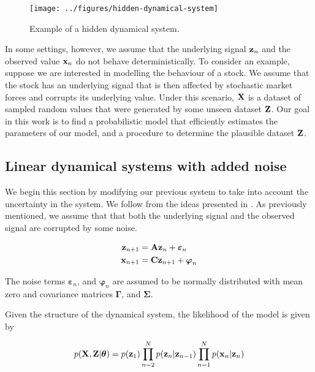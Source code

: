 \documentclass[11pt]{article}
\numberwithin{equation}{section}
\newcommand{\x}{{\bf x}}
\newcommand{\z}{{\bf z}}
\begin{document}
\begin{figure}[h!]
	\centering
	\texttt{[image: ../figures/hidden-dynamical-system]}
	\caption{Example of a hidden dynamical system.}
	\label{fig:hidden-dynamical-system}
\end{figure}

In some settings, however, we assume that the underlying signal $\z_n$ and the observed value $\x_n$ do not behave deterministically. To consider an example, suppose we are interested in modelling the behaviour of a stock. We assume that the stock has an underlying signal that is then affected by stochastic market forces and corrupts its underlying value. Under this scenario, ${\bf X}$ is a dataset of sampled random values that were generated by some unseen dataset ${\bf Z}$. Our goal in this work is to find a probabilistic model that efficiently estimates the parameters of our model, and a procedure to determine the plausible dataset $\bf Z$. 


\subsection{Linear dynamical systems with added noise}
We begin this section by modifying our previous system to take into account the uncertainty in the system. We follow from the ideas presented in \cite{prml}. As previously mentioned, we assume that that both the underlying signal and the observed signal are corrupted by some noise.
 

\begin{align*}
	\z_{n+1} &= {\bf A} \z_{n} + \boldsymbol\varepsilon_n\\
	\x_{n+1} &= {\bf C} \z_{n+1} + \boldsymbol\varphi_n
\end{align*}

The noise terms $\boldsymbol{\varepsilon}_n$, and $\boldsymbol{\varphi}_n$ are assumed to be normally distributed with mean zero and covariance matrices $\boldsymbol{\Gamma}$, and $\boldsymbol{\Sigma}$.

Given the structure of the dynamical system, the likelihood of the model is given by

\begin{equation}
	p({\bf X}, {\bf Z} \vert\boldsymbol\theta) = p(\z_1)\prod_{n=2}^N p(\z_n\vert \z_{n-1})\prod_{n=1}^N p(\x_n\vert \z_n)
\end{equation}
\end{document}

